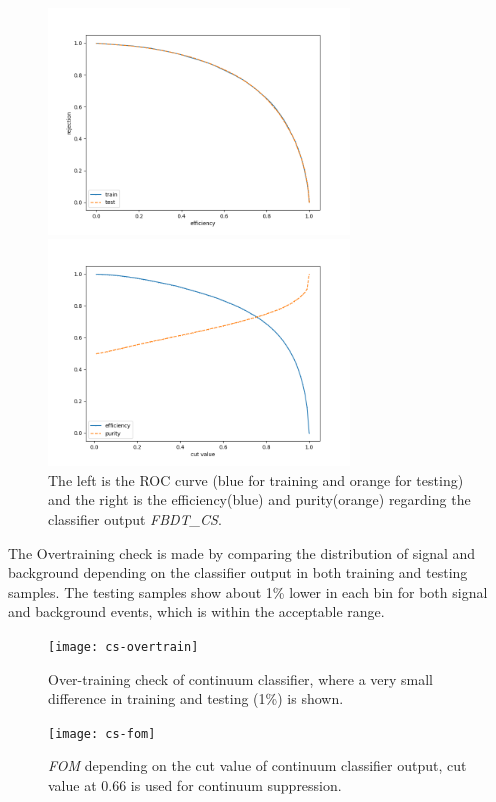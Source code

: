 \begin{figure}[htpb]
	\begin{minipage}[b]{0.5\linewidth}
		\centering 
		\includegraphics[height=6cm]{figures/ROC_CS}	
	\end{minipage}
	\begin{minipage}[b]{0.5\linewidth}
		\centering 
		\includegraphics[height=6cm]{figures/eff_CS}	
	\end{minipage}
\caption{The left is the ROC curve (blue for training and orange for testing)
	and the right is the efficiency(blue) and purity(orange) regarding the classifier output \textit{FBDT\_CS}.}
	\label{fig:cs_roc}
\end{figure}

The Overtraining check is made by comparing the distribution of signal and background depending on the classifier output in both training and testing samples. The testing samples show about 1\% lower in each bin for both signal and background events, which is within the acceptable range.  
\begin{figure}[htpb]
	\centering
	\texttt{[image: cs-overtrain]}
	\caption{Over-training check of continuum classifier, where a very small difference in training and testing (1\%) is shown.}
\end{figure}

\begin{figure}[H]
	\centering
	\texttt{[image: cs-fom]}
	\caption{\textit{FOM} depending on the cut value of continuum classifier output, cut value at 0.66 is used for continuum suppression. }
	\label{fig:cs_fom}
\end{figure}

